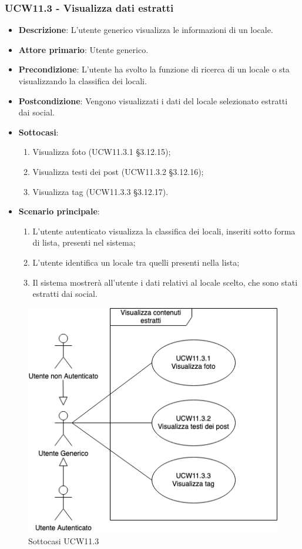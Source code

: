 \subsubsection{UCW11.3 - Visualizza dati estratti}
\begin{itemize}
    \item \textbf{Descrizione}: L'utente generico visualizza le informazioni di un locale.
    \item \textbf{Attore primario}: Utente generico.
    \item \textbf{Precondizione}: L'utente ha svolto la funzione di ricerca di un locale o sta visualizzando la classifica dei locali.
    \item \textbf{Postcondizione}: Vengono visualizzati i dati del locale selezionato estratti dai social.
    \item \textbf{Sottocasi}:
	\begin{enumerate}
		\item Visualizza foto (UCW11.3.1 \S{}3.12.15);
		\item Visualizza testi dei post (UCW11.3.2 \S{}3.12.16);
		\item Visualizza tag (UCW11.3.3 \S{}3.12.17).
	\end{enumerate}
    \item \textbf{Scenario principale}: 
    \begin{enumerate}
	\item L'utente autenticato visualizza la classifica dei locali, inseriti sotto forma di lista, presenti nel sistema;
    \item L'utente identifica un locale tra quelli presenti nella lista;
    \item Il sistema mostrerà all'utente i dati relativi al locale scelto, che sono stati estratti dai social.
    \end{enumerate}
\end{itemize}

\begin{figure}[H]
	\centering
	\includegraphics[scale=0.5]{UC_images/UCW11-3.png} 
	\caption{Sottocasi UCW11.3}
\end{figure}

